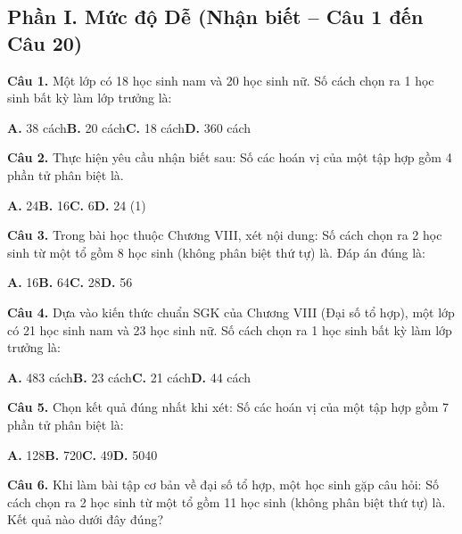\documentclass[11pt,a4paper]{article}
\begin{document}
\subsection*{\color{accent} Phần I. Mức độ Dễ (Nhận biết -- Câu 1 đến Câu 20)}
\textbf{\color{primary} Câu 1.} Một lớp có 18 học sinh nam và 20 học sinh nữ. Số cách chọn ra 1 học sinh bất kỳ làm lớp trưởng là:\par
\hspace*{1.5em}\textbf{A.} 38 cách\quad\quad \textbf{B.} 20 cách\quad\quad \textbf{C.} 18 cách\quad\quad \textbf{D.} 360 cách\par\vspace{2pt}
\textbf{\color{primary} Câu 2.} Thực hiện yêu cầu nhận biết sau: Số các hoán vị của một tập hợp gồm 4 phần tử phân biệt là.\par
\hspace*{1.5em}\textbf{A.} 24\quad\quad \textbf{B.} 16\quad\quad \textbf{C.} 6\quad\quad \textbf{D.} 24 (1)\par\vspace{2pt}
\textbf{\color{primary} Câu 3.} Trong bài học thuộc Chương VIII, xét nội dung: Số cách chọn ra 2 học sinh từ một tổ gồm 8 học sinh (không phân biệt thứ tự) là. Đáp án đúng là:\par
\hspace*{1.5em}\textbf{A.} 16\quad\quad \textbf{B.} 64\quad\quad \textbf{C.} 28\quad\quad \textbf{D.} 56\par\vspace{2pt}
\textbf{\color{primary} Câu 4.} Dựa vào kiến thức chuẩn SGK của Chương VIII (Đại số tổ hợp), một lớp có 21 học sinh nam và 23 học sinh nữ. Số cách chọn ra 1 học sinh bất kỳ làm lớp trưởng là:\par
\hspace*{1.5em}\textbf{A.} 483 cách\quad\quad \textbf{B.} 23 cách\quad\quad \textbf{C.} 21 cách\quad\quad \textbf{D.} 44 cách\par\vspace{2pt}
\textbf{\color{primary} Câu 5.} Chọn kết quả đúng nhất khi xét: Số các hoán vị của một tập hợp gồm 7 phần tử phân biệt là:\par
\hspace*{1.5em}\textbf{A.} 128\quad\quad \textbf{B.} 720\quad\quad \textbf{C.} 49\quad\quad \textbf{D.} 5040\par\vspace{2pt}
\textbf{\color{primary} Câu 6.} Khi làm bài tập cơ bản về đại số tổ hợp, một học sinh gặp câu hỏi: Số cách chọn ra 2 học sinh từ một tổ gồm 11 học sinh (không phân biệt thứ tự) là. Kết quả nào dưới đây đúng?\par
\end{document}
